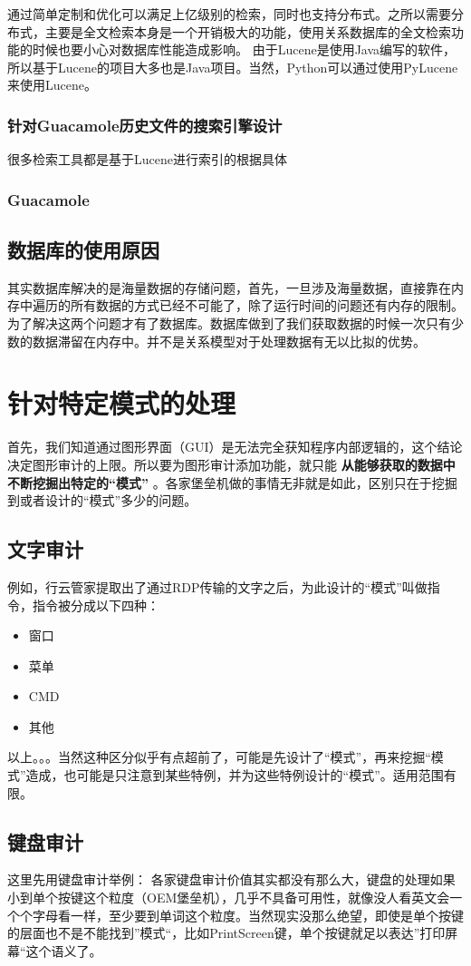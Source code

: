 \documentclass[fontset=windows,11pt]{ctexart}
\begin{document}
通过简单定制和优化可以满足上亿级别的检索，同时也支持分布式。之所以需要分布式，主要是全文检索本身是一个开销极大的功能，使用关系数据库的全文检索功能的时候也要小心对数据库性能造成影响。
由于Lucene是使用Java编写的软件，所以基于Lucene的项目大多也是Java项目。当然，Python可以通过使用PyLucene来使用Lucene。
\subsubsection{针对Guacamole历史文件的搜索引擎设计}
\label{sec-3-4-4}
很多检索工具都是基于Lucene进行索引的根据具体
\subsubsection{Guacamole}
\label{sec-3-4-5}
\subsection{数据库的使用原因}
\label{sec-3-5}
其实数据库解决的是海量数据的存储问题，首先，一旦涉及海量数据，直接靠在内存中遍历的所有数据的方式已经不可能了，除了运行时间的问题还有内存的限制。为了解决这两个问题才有了数据库。数据库做到了我们获取数据的时候一次只有少数的数据滞留在内存中。并不是关系模型对于处理数据有无以比拟的优势。

\section{针对特定模式的处理}
\label{sec-4}
首先，我们知道通过图形界面（GUI）是无法完全获知程序内部逻辑的，这个结论决定图形审计的上限。所以要为图形审计添加功能，就只能 \textbf{从能够获取的数据中不断挖掘出特定的“模式”} 。各家堡垒机做的事情无非就是如此，区别只在于挖掘到或者设计的“模式”多少的问题。
\subsection{文字审计}
\label{sec-4-1}
例如，行云管家提取出了通过RDP传输的文字之后，为此设计的“模式”叫做指令，指令被分成以下四种：
\begin{itemize}
\item 窗口
\item 菜单
\item CMD
\item 其他
\end{itemize}
以上。。。当然这种区分似乎有点超前了，可能是先设计了“模式”，再来挖掘“模式”造成，也可能是只注意到某些特例，并为这些特例设计的“模式”。适用范围有限。
\subsection{键盘审计}
\label{sec-4-2}
这里先用键盘审计举例：
各家键盘审计价值其实都没有那么大，键盘的处理如果小到单个按键这个粒度（OEM堡垒机），几乎不具备可用性，就像没人看英文会一个个字母看一样，至少要到单词这个粒度。当然现实没那么绝望，即使是单个按键的层面也不是不能找到”模式“，比如PrintScreen键，单个按键就足以表达”打印屏幕“这个语义了。
\end{document}
